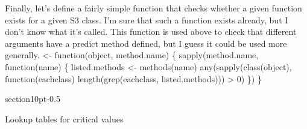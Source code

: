 \documentclass[10pt]{article}%
\makeatletter
\renewcommand\section{\@startsection%
{section}{1}{0pt}{-\baselineskip}{0.5\baselineskip}%
{\normalfont\normalsize\bfseries\large\raggedright}}
\makeatother
\begin{document}
Finally, let's define a fairly simple function that checks whether a
given function exists for a given S3 class.  I'm sure that such a
function exists already, but I don't know what it's called.  This
function is used above to check that different arguments have a
{\Tt{}predict\nwendquote} method defined, but I guess it could be used more generally.
\nwenddocs{}\plusendmoddef\nwstartdeflinemarkup{}\nwenddeflinemarkup
{} <- function(object, method.name) \{
  sapply(method.name, function(name) \{
    listed.methods <- methods(name)
    any(sapply(class(object), function(eachclass)
               length(grep(eachclass, listed.methods))) > 0)
  \})
\}
\eatline
{}\nwendcode{}\nwdocspar
\appendix

\section{Lookup tables for \citet{Mcc:07} critical values}
\end{document}
